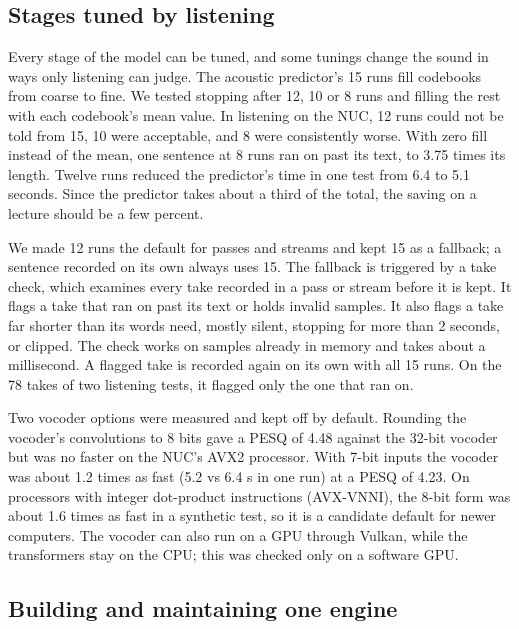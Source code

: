\documentclass[11pt]{article}
\begin{document}
\hypertarget{stages-tuned-by-listening}{%
\subsection{Stages tuned by listening}\label{stages-tuned-by-listening}}

Every stage of the model can be tuned, and some tunings change the sound
in ways only listening can judge. The acoustic predictor's 15 runs fill
codebooks from coarse to fine. We tested stopping after 12, 10 or 8 runs
and filling the rest with each codebook's mean value. In listening on
the NUC, 12 runs could not be told from 15, 10 were acceptable, and 8
were consistently worse. With zero fill instead of the mean, one
sentence at 8 runs ran on past its text, to 3.75 times its length.
Twelve runs reduced the predictor's time in one test from 6.4 to 5.1
seconds. Since the predictor takes about a third of the total, the
saving on a lecture should be a few percent.

We made 12 runs the default for passes and streams and kept 15 as a
fallback; a sentence recorded on its own always uses 15. The fallback is
triggered by a take check, which examines every take recorded in a pass
or stream before it is kept. It flags a take that ran on past its text
or holds invalid samples. It also flags a take far shorter than its
words need, mostly silent, stopping for more than 2 seconds, or clipped.
The check works on samples already in memory and takes about a
millisecond. A flagged take is recorded again on its own with all 15
runs. On the 78 takes of two listening tests, it flagged only the one
that ran on.

Two vocoder options were measured and kept off by default. Rounding the
vocoder's convolutions to 8 bits gave a PESQ of 4.48 against the 32-bit
vocoder but was no faster on the NUC's AVX2 processor. With 7-bit inputs
the vocoder was about 1.2 times as fast (5.2 vs 6.4 s in one run) at a
PESQ of 4.23. On processors with integer dot-product instructions
(AVX-VNNI), the 8-bit form was about 1.6 times as fast in a synthetic
test, so it is a candidate default for newer computers. The vocoder can
also run on a GPU through Vulkan, while the transformers stay on the
CPU; this was checked only on a software GPU.

\hypertarget{building-and-maintaining-one-engine}{%
\subsection{Building and maintaining one
engine}\label{building-and-maintaining-one-engine}}
\end{document}

